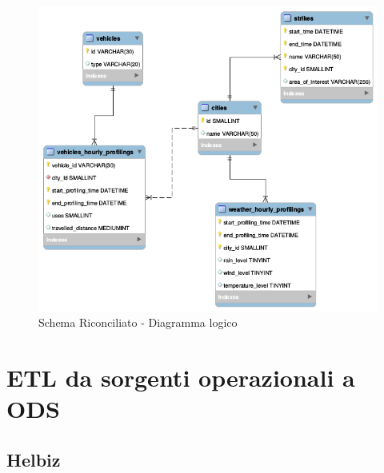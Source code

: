 \begin{figure}[H]                                                                                                                                                            
\centering                                                                                                                                                                   
\includegraphics[width=\textwidth]{diagrams/riconciliato_er}                                                                                                                                   
\caption{Schema Riconciliato - Diagramma logico}                                                                                                                                            
\label{fig:riconciliato_er}                                                                                                                                                           
\end{figure}

\label{sec:etl_sorgenti_ODS}
\section{ETL da sorgenti operazionali a ODS}

\subsection{Helbiz}

